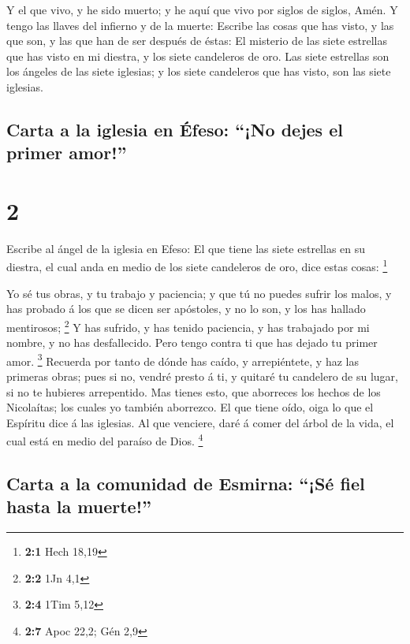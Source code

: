  Y el que vivo, y he sido muerto; y he aquí que vivo por
siglos de siglos, Amén. Y tengo las llaves del infierno y de la muerte:
 Escribe las cosas que has visto, y las que son, y las
que han de ser después de éstas:  El misterio de las
siete estrellas que has visto en mi diestra, y los siete candeleros de
oro. Las siete estrellas son los ángeles de las siete iglesias; y los
siete candeleros que has visto, son las siete iglesias.

\hypertarget{carta-a-la-iglesia-en-uxe9feso-no-dejes-el-primer-amor}{%
\subsection{Carta a la iglesia en Éfeso: ``¡No dejes el primer
amor!''}\label{carta-a-la-iglesia-en-uxe9feso-no-dejes-el-primer-amor}}

\hypertarget{section-1}{%
\section{2}\label{section-1}}

 Escribe al ángel de la iglesia en Efeso: El que tiene las
siete estrellas en su diestra, el cual anda en medio de los siete
candeleros de oro, dice estas cosas: \footnote{\textbf{2:1} Hech 18,19}

 Yo sé tus obras, y tu trabajo y paciencia; y que tú no
puedes sufrir los malos, y has probado á los que se dicen ser apóstoles,
y no lo son, y los has hallado mentirosos; \footnote{\textbf{2:2} 1Jn
  4,1}  Y has sufrido, y has tenido paciencia, y has
trabajado por mi nombre, y no has desfallecido.  Pero
tengo contra ti que has dejado tu primer amor. \footnote{\textbf{2:4}
  1Tim 5,12}  Recuerda por tanto de dónde has caído, y
arrepiéntete, y haz las primeras obras; pues si no, vendré presto á ti,
y quitaré tu candelero de su lugar, si no te hubieres arrepentido.
 Mas tienes esto, que aborreces los hechos de los
Nicolaítas; los cuales yo también aborrezco.  El que tiene
oído, oiga lo que el Espíritu dice á las iglesias. Al que venciere, daré
á comer del árbol de la vida, el cual está en medio del paraíso de Dios.
\footnote{\textbf{2:7} Apoc 22,2; Gén 2,9}

\hypertarget{carta-a-la-comunidad-de-esmirna-suxe9-fiel-hasta-la-muerte}{%
\subsection{Carta a la comunidad de Esmirna: ``¡Sé fiel hasta la
muerte!''}\label{carta-a-la-comunidad-de-esmirna-suxe9-fiel-hasta-la-muerte}}

